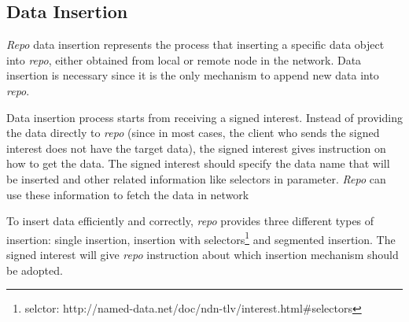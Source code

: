\documentclass[conference]{IEEEtran}
\begin{document}
\subsection{Data Insertion}

\emph{Repo} data insertion represents the process that inserting a specific data object into \emph{repo}, either obtained from local or remote node in the network. Data insertion is necessary since it is the only mechanism to append new data into \emph{repo}.

Data insertion process starts from receiving a signed interest. Instead of providing the data directly to \emph{repo} (since in most cases, the client who sends the signed interest does not have the target data), the signed interest gives instruction on how to get the data. The signed interest should specify the data name that will be inserted and other related information like selectors in parameter. \emph{Repo} can use these information to fetch the data in network

To insert data efficiently and correctly, \emph{repo} provides three different types of insertion: single insertion, insertion with selectors\footnote{selctor: http://named-data.net/doc/ndn-tlv/interest.html\#selectors} and segmented insertion. The signed interest will give \emph{repo} instruction about which insertion mechanism should be adopted.
\end{document}
